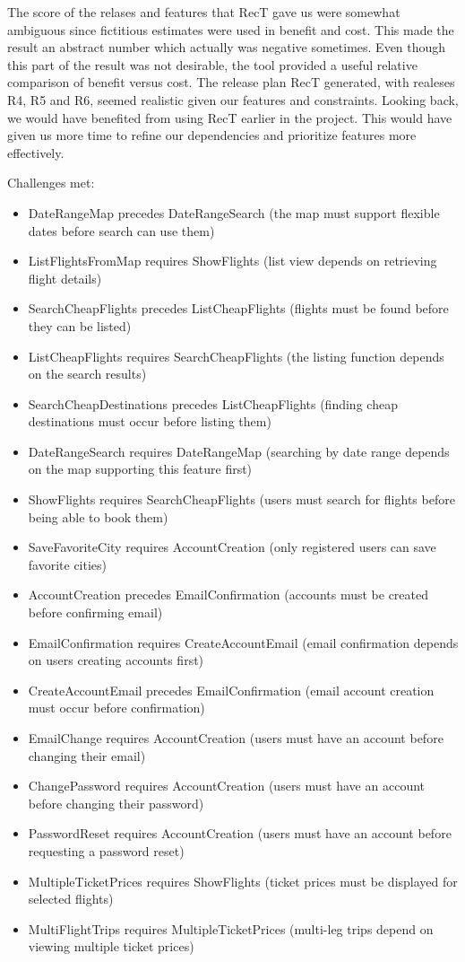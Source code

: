 The score of the relases and features that RecT gave us were somewhat ambiguous since fictitious estimates were used in benefit and cost. This made the result an abstract number which actually was negative sometimes. Even though this part of the result was not desirable, the tool provided a useful relative comparison of benefit versus cost. The release plan RecT generated, with realeses R4, R5 and R6, seemed realistic given our features and constraints. Looking back, we would have benefited from using RecT earlier in the project. This would have given us more time to refine our dependencies and prioritize features more effectively. 

Challenges met:
\begin{itemize}
    \item DateRangeMap precedes DateRangeSearch (the map must support flexible dates before search can use them)
    \item ListFlightsFromMap requires ShowFlights (list view depends on retrieving flight details)
    \item SearchCheapFlights precedes ListCheapFlights (flights must be found before they can be listed)
    \item ListCheapFlights requires SearchCheapFlights (the listing function depends on the search results)
    \item SearchCheapDestinations precedes ListCheapFlights (finding cheap destinations must occur before listing them)
    \item DateRangeSearch requires DateRangeMap (searching by date range depends on the map supporting this feature first)
    \item ShowFlights requires SearchCheapFlights (users must search for flights before being able to book them)
    \item SaveFavoriteCity requires AccountCreation (only registered users can save favorite cities)
    \item AccountCreation precedes EmailConfirmation (accounts must be created before confirming email)
    \item EmailConfirmation requires CreateAccountEmail (email confirmation depends on users creating accounts first)
    \item CreateAccountEmail precedes EmailConfirmation (email account creation must occur before confirmation)
    \item EmailChange requires AccountCreation (users must have an account before changing their email)
    \item ChangePassword requires AccountCreation (users must have an account before changing their password)
    \item PasswordReset requires AccountCreation (users must have an account before requesting a password reset)
    \item MultipleTicketPrices requires ShowFlights (ticket prices must be displayed for selected flights)
    \item MultiFlightTrips requires MultipleTicketPrices (multi-leg trips depend on viewing multiple ticket prices)
\end{itemize}
